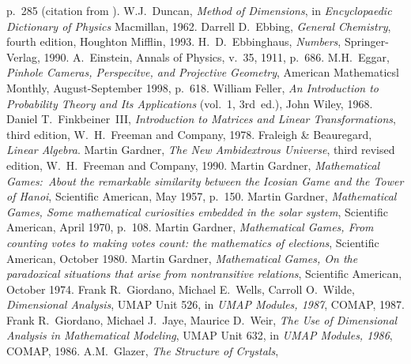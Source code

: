 \begin{thebibliography}{\makebox[2em][c]{{}\hfil{}}}
 p.~285
 (citation from \cite{Ball}).
  W.J.~Duncan,
  \emph{Method of Dimensions},
  in
  \emph{Encyclopaedic Dictionary of Physics}
  Macmillan,
  1962.
  Darrell D.~Ebbing,
  \emph{General Chemistry},
  fourth edition,
  Houghton Mifflin,
  1993.
  H.\ D.\ Ebbinghaus,
  \emph{Numbers},
  Springer-Verlag,
  1990.
  A.~Einstein,
  Annals of Physics,
  v.~35, 1911,
  p.~686.
  M.H.~Eggar,
  \emph{Pinhole Cameras, Perspecitve, and Projective Geometry},
  American Mathematicsl Monthly,
  August-September 1998,
  p.~618.
  William Feller,
  \emph{An Introduction to Probability Theory and Its Applications}
  (vol.~1, 3rd~ed.),
  John Wiley, 1968.
  Daniel T.\ Finkbeiner~III,
  \emph{Introduction to Matrices and Linear Transformations},
  third edition,
  W.\ H.\ Freeman and Company,
  1978.
  Fraleigh \& Beauregard,
  \emph{Linear Algebra}.
  Martin Gardner,
  \emph{The New Ambidextrous Universe},
  third revised edition,
  W.\ H.\ Freeman and Company,
  1990.
 Martin Gardner,
 \emph{Mathematical Games:~About the remarkable similarity between
   the Icosian Game and the Tower of Hanoi},
 Scientific American,
 May 1957,
 p.~150. 
  Martin Gardner,
  \emph{Mathematical Games, Some mathematical curiosities embedded in the
        solar system},
  Scientific American,
  April 1970,
  p.~108.
  Martin Gardner,
  \emph{Mathematical Games, From counting votes to making votes count:
        the mathematics of elections},
  Scientific American,
  October 1980.
  Martin Gardner,
  \emph{Mathematical Games, On the paradoxical situations that arise from
        nontransitive relations},
  Scientific American,
  October 1974.
  Frank R.~Giordano,  Michael E.~Wells, Carroll O.~Wilde,
  \emph{Dimensional Analysis}, 
  UMAP Unit 526,
  in
  \emph{UMAP Modules, 1987},
  COMAP,
  1987.
  Frank R.~Giordano,  Michael J.~Jaye, Maurice D.~Weir,
  \emph{The Use of Dimensional Analysis in Mathematical Modeling}, 
  UMAP Unit 632,
  in
  \emph{UMAP Modules, 1986},
  COMAP,
  1986.
  A.M.~Glazer,
  \emph{The Structure of Crystals},

\end{thebibliography}
